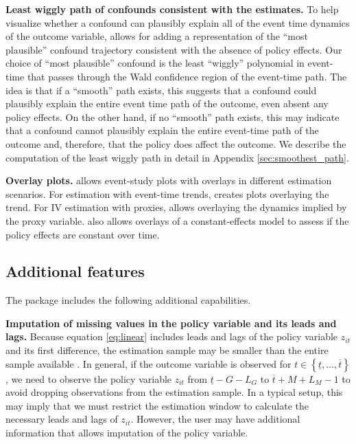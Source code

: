 \documentclass[12pt]{article}
\begin{document}
\noindent \textbf{Least wiggly path of confounds consistent with the estimates.}
To help visualize whether a confound can plausibly explain all of the event time dynamics of the outcome variable, \xtevent allows for adding a representation of the ``most plausible'' confound trajectory consistent with the absence of policy effects.
Our choice of ``most plausible'' confound is the least ``wiggly'' polynomial in event-time that passes through the Wald confidence region of the event-time path.
The idea is that if a ``smooth'' path exists, this suggests that a confound could plausibly explain the entire event time path of the outcome, even absent any policy effects.
On the other hand, if no ``smooth'' path exists, this may indicate that a confound cannot plausibly explain the entire event-time path of the outcome and, therefore, that the policy does affect the outcome.
We describe the computation of the least wiggly path in detail in Appendix \ref{sec:smoothest_path}.

\noindent \textbf{Overlay plots.}
\xteventplot allows event-study plots with overlays in different estimation scenarios. For estimation with event-time trends, \xteventplot creates plots overlaying the trend.
For IV estimation with proxies, \xteventplot allows overlaying the dynamics implied by the proxy variable.
\xteventplot also allows overlays of a constant-effects model to assess if the policy effects are constant over time.

\subsection{Additional features}
\label{subsec:additional_features}

The package includes the following additional capabilities.

\noindent \textbf{Imputation of missing values in the policy variable and its leads and lags.}
\label{newcite_sample}
Because equation \eqref{eq:linear} includes leads and lags of the policy variable $z_{it}$ and its first difference, the estimation sample may be smaller than the entire sample available \citep{schmidheiny2023event}.
In general, if the outcome variable is observed for $t \in \left\{\underline{t},\ldots,\overline{t} \right\}$, we need to observe the policy variable $z_{it}$ from $\underline{t} - G - L_G$ to $\overline{t} + M + L_M -1$ to avoid dropping observations from the estimation sample.
In a typical setup, this may imply that we must restrict the estimation window to calculate the necessary leads and lags of $z_{it}$.
However, the user may have additional information that allows imputation of the policy variable.
\end{document}
